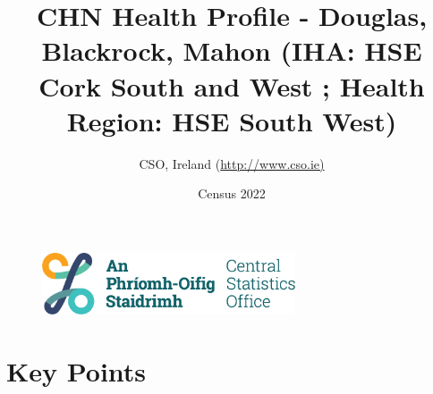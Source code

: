 \documentclass{article}
\title{CHN Health Profile - Douglas, Blackrock, Mahon (IHA: HSE Cork South and West ;  Health Region: HSE South West) }
\date{Census 2022}
\author{CSO, Ireland  (\url{http://www.cso.ie)}}
\begin{document}


\begin{figure}
	\centering
\includegraphics[width =75mm]{../figures/CSO_Logo.png}
\end{figure}

				 
		   
						  
														  
																																													
												 
			 
\maketitle
					
													   
				 
						 
																																																																											   
				 
				  
  \pagebreak
    	    \tableofcontents

\pagebreak


\section{Key Points}
\end{document}
